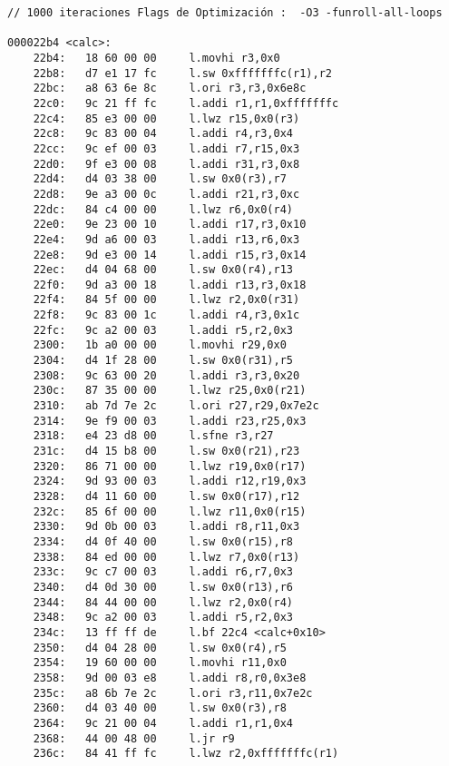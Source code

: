 \begin{lstlisting}[frame=single]
// 1000 iteraciones Flags de Optimización :  -O3 -funroll-all-loops

000022b4 <calc>:
    22b4:	18 60 00 00 	l.movhi r3,0x0
    22b8:	d7 e1 17 fc 	l.sw 0xfffffffc(r1),r2
    22bc:	a8 63 6e 8c 	l.ori r3,r3,0x6e8c
    22c0:	9c 21 ff fc 	l.addi r1,r1,0xfffffffc
    22c4:	85 e3 00 00 	l.lwz r15,0x0(r3)
    22c8:	9c 83 00 04 	l.addi r4,r3,0x4
    22cc:	9c ef 00 03 	l.addi r7,r15,0x3
    22d0:	9f e3 00 08 	l.addi r31,r3,0x8
    22d4:	d4 03 38 00 	l.sw 0x0(r3),r7
    22d8:	9e a3 00 0c 	l.addi r21,r3,0xc
    22dc:	84 c4 00 00 	l.lwz r6,0x0(r4)
    22e0:	9e 23 00 10 	l.addi r17,r3,0x10
    22e4:	9d a6 00 03 	l.addi r13,r6,0x3
    22e8:	9d e3 00 14 	l.addi r15,r3,0x14
    22ec:	d4 04 68 00 	l.sw 0x0(r4),r13
    22f0:	9d a3 00 18 	l.addi r13,r3,0x18
    22f4:	84 5f 00 00 	l.lwz r2,0x0(r31)
    22f8:	9c 83 00 1c 	l.addi r4,r3,0x1c
    22fc:	9c a2 00 03 	l.addi r5,r2,0x3
    2300:	1b a0 00 00 	l.movhi r29,0x0
    2304:	d4 1f 28 00 	l.sw 0x0(r31),r5
    2308:	9c 63 00 20 	l.addi r3,r3,0x20
    230c:	87 35 00 00 	l.lwz r25,0x0(r21)
    2310:	ab 7d 7e 2c 	l.ori r27,r29,0x7e2c
    2314:	9e f9 00 03 	l.addi r23,r25,0x3
    2318:	e4 23 d8 00 	l.sfne r3,r27
    231c:	d4 15 b8 00 	l.sw 0x0(r21),r23
    2320:	86 71 00 00 	l.lwz r19,0x0(r17)
    2324:	9d 93 00 03 	l.addi r12,r19,0x3
    2328:	d4 11 60 00 	l.sw 0x0(r17),r12
    232c:	85 6f 00 00 	l.lwz r11,0x0(r15)
    2330:	9d 0b 00 03 	l.addi r8,r11,0x3
    2334:	d4 0f 40 00 	l.sw 0x0(r15),r8
    2338:	84 ed 00 00 	l.lwz r7,0x0(r13)
    233c:	9c c7 00 03 	l.addi r6,r7,0x3
    2340:	d4 0d 30 00 	l.sw 0x0(r13),r6
    2344:	84 44 00 00 	l.lwz r2,0x0(r4)
    2348:	9c a2 00 03 	l.addi r5,r2,0x3
    234c:	13 ff ff de 	l.bf 22c4 <calc+0x10>
    2350:	d4 04 28 00 	l.sw 0x0(r4),r5
    2354:	19 60 00 00 	l.movhi r11,0x0
    2358:	9d 00 03 e8 	l.addi r8,r0,0x3e8
    235c:	a8 6b 7e 2c 	l.ori r3,r11,0x7e2c
    2360:	d4 03 40 00 	l.sw 0x0(r3),r8
    2364:	9c 21 00 04 	l.addi r1,r1,0x4
    2368:	44 00 48 00 	l.jr r9
    236c:	84 41 ff fc 	l.lwz r2,0xfffffffc(r1)
	\end{lstlisting}		

